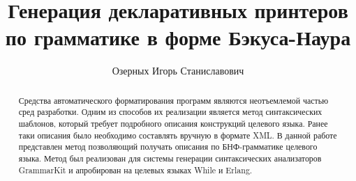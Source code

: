 \title{Генерация декларативных принтеров по грамматике в форме Бэкуса-Наура}


\author{Озерных Игорь Станиславович}



\maketitle             

\begin{abstract}
Средства автоматического форматирования программ
являются неотъемлемой частью сред разработки.
Одним из способов их реализации является метод
синтаксических шаблонов, который требует подробного
описания конструкций целевого языка. Ранее таки описания
было необходимо составлять вручную в формате XML. В данной работе
представлен метод позволяющий получать описания по БНФ-грамматике
целевого языка. Метод был реализован для системы
генерации синтаксических анализаторов GrammarKit и апробирован
на целевых языках While и Erlang.
\end{abstract}









